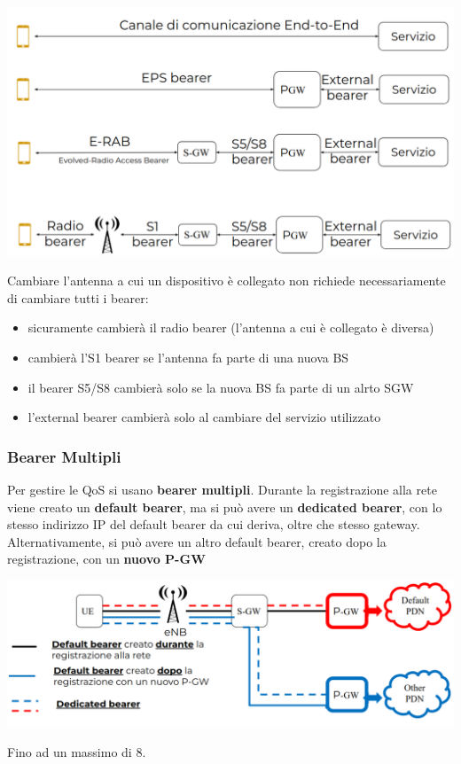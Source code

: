 \begin{center}
	\includegraphics[width=0.8\linewidth]{img/4g/bearing}
\end{center}

Cambiare l'antenna a cui un dispositivo è collegato non richiede necessariamente di cambiare tutti i bearer: 
\begin{itemize}
	\item sicuramente cambierà il radio bearer (l'antenna a cui è collegato è diversa)
    
	\item cambierà l'S1 bearer se l'antenna fa parte di una nuova BS

	\item il bearer S5/S8 cambierà solo se la nuova BS fa parte di un alrto SGW

    \item l'external bearer cambierà solo al cambiare del servizio utilizzato
\end{itemize}

\subsubsection{Bearer Multipli} 

Per gestire le QoS si usano \textbf{bearer multipli}. Durante la registrazione alla rete viene creato un \textbf{default bearer}, ma si può avere un \textbf{dedicated bearer}, con lo stesso indirizzo IP del default bearer da cui deriva, oltre che stesso gateway. Alternativamente, si può avere un altro default bearer, creato dopo la registrazione, con un \textbf{nuovo P-GW}
\begin{center}
	\includegraphics[width=0.9\linewidth]{img/4g/dedicatedbearing}
\end{center}
Fino ad un massimo di 8.

